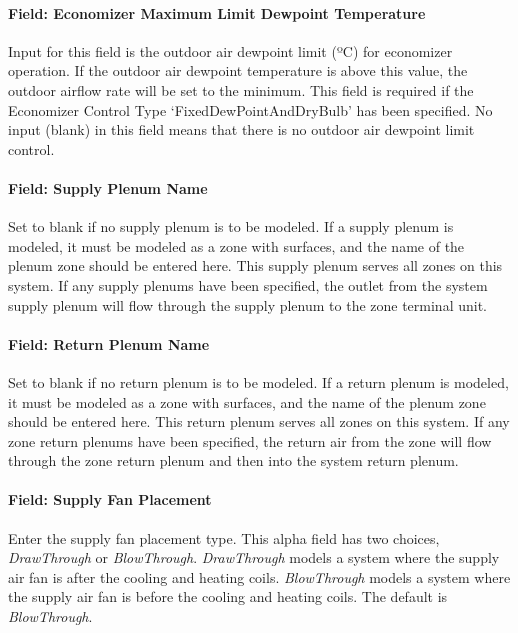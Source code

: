 \paragraph{Field: Economizer Maximum Limit Dewpoint Temperature}\label{field-economizer-maximum-limit-dewpoint-temperature-000}

Input for this field is the outdoor air dewpoint limit (ºC) for economizer operation. If the outdoor air dewpoint temperature is above this value, the outdoor airflow rate will be set to the minimum. This field is required if the Economizer Control Type `FixedDewPointAndDryBulb' has been specified. No input (blank) in this field means that there is no outdoor air dewpoint limit control.

\paragraph{Field: Supply Plenum Name}\label{field-supply-plenum-name-5}

Set to blank if no supply plenum is to be modeled. If a supply plenum is modeled, it must be modeled as a zone with surfaces, and the name of the plenum zone should be entered here. This supply plenum serves all zones on this system. If any supply plenums have been specified, the outlet from the system supply plenum will flow through the supply plenum to the zone terminal unit.

\paragraph{Field: Return Plenum Name}\label{field-return-plenum-name-6}

Set to blank if no return plenum is to be modeled. If a return plenum is modeled, it must be modeled as a zone with surfaces, and the name of the plenum zone should be entered here. This return plenum serves all zones on this system. If any zone return plenums have been specified, the return air from the zone will flow through the zone return plenum and then into the system return plenum.

\paragraph{Field: Supply Fan Placement}\label{field-supply-fan-placement-4}

Enter the supply fan placement type. This alpha field has two choices, \emph{DrawThrough} or \emph{BlowThrough}. \emph{DrawThrough} models a system where the supply air fan is after the cooling and heating coils. \emph{BlowThrough} models a system where the supply air fan is before the cooling and heating coils. The default is \emph{BlowThrough}.

